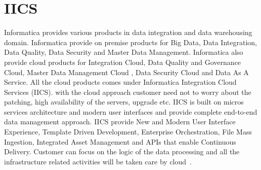 \section{IICS}

Informatica provides various products in data integration and data 
warehousing domain. Informatica provide on premise products for Big 
Data, Data Integration, Data Quality, Data Security and Master Data 
Management. Informatica also provide cloud products for Integration 
Cloud, Data Quality and Governance Cloud, Master Data Management Cloud
, Data Security Cloud and Data As A Service. All the cloud products 
comes under Informatica Integration Cloud Services (IICS).
with the cloud approach customer need not to worry about the patching,
high availability of the servers, upgrade etc. IICS is 
built on micros services architecture and modern user interfaces and 
provide complete end-to-end data management approach. IICS
provide New and Modern User Interface Experience, Template Driven 
Development, Enterprise Orchestration, File Mass Ingestion, Integrated
Asset Management and APIs that enable Continuous Delivery. Customer 
can focus on the logic of the data processing and all the 
infrastructure related activities will be taken care by 
cloud~\cite{hid-sp18-511-iics}.
